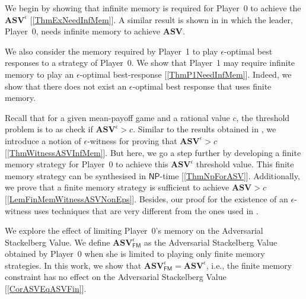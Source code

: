 
We begin by showing that infinite memory is required for Player~0 to achieve the $\mathbf{ASV}^{\epsilon}$ [\cref{ThmExNeedInfMem}]. A similar result is shown in \cite{FGR20} in which the leader, Player~0, needs infinite memory to achieve $\mathbf{ASV}$.

We also consider the memory required by Player~1 to play $\epsilon$-optimal best responses to a strategy of Player~0. We show that Player~1 may require infinite memory to play an $\epsilon$-optimal best-response [\cref{ThmP1NeedInfMem}].  Indeed, we show that there does not exist an $\epsilon$-optimal best response that uses finite memory.

Recall that for a given mean-payoff game and a rational value $c$, the threshold problem is to as check if $\mathbf{ASV}^{\epsilon} > c$. Similar to the results obtained in \cite{FGR20}, we introduce a notion of $\epsilon$-witness for proving that $\mathbf{ASV}^{\epsilon} > c$ [\cref{ThmWitnessASVInfMem}]. But here, we go a step further by developing a finite memory strategy for Player~0 to achieve this $\mathbf{ASV}^{\epsilon}$ threshold value. This finite memory strategy can be synthesised in $\mathsf{NP}$-time [\cref{ThmNpForASV}]. Additionally, we prove that a finite memory strategy is sufficient to achieve $\mathbf{ASV} > c$ [\cref{LemFinMemWitnessASVNonEps}]. Besides, our proof for the existence of an $\epsilon$-witness uses techniques that are very different from the ones used in \cite{FGR20}.

We explore the effect of limiting Player~0's memory on the Adversarial Stackelberg Value. We define $\mathbf{ASV}^{\epsilon}_{\mathsf{FM}}$ as the Adversarial Stackelberg Value obtained by Player~0 when she is limited to playing only finite memory strategies. In this work, we show that $\mathbf{ASV}^{\epsilon}_{\mathsf{FM}} = \mathbf{ASV}^{\epsilon}$, i.e., the finite memory constraint has no effect on the Adversarial Stackelberg Value [\cref{CorASVEqASVFin}].

